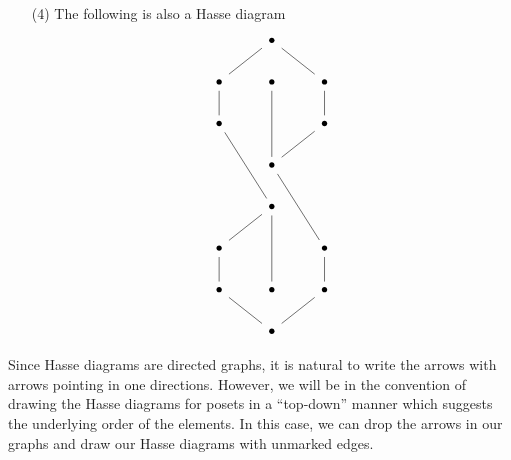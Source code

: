 \begin{example}
\begin{enumerate}
    \item[(4)] The following is also a Hasse diagram
      \[\begin{tikzcd}
        & \bullet \\
        \bullet & \bullet & \bullet \\
        \bullet && \bullet \\
                & \bullet \\
                & \bullet \\
        \bullet && \bullet \\
        \bullet & \bullet & \bullet \\
        & \bullet
        \arrow[no head, from=2-1, to=1-2]
        \arrow[no head, from=2-1, to=3-1]
        \arrow[no head, from=2-2, to=4-2]
        \arrow[no head, from=2-3, to=1-2]
        \arrow[no head, from=2-3, to=3-3]
        \arrow[no head, from=3-1, to=5-2]
        \arrow[no head, from=3-3, to=4-2]
        \arrow[no head, from=4-2, to=6-3]
        \arrow[no head, from=5-2, to=7-2]
        \arrow[no head, from=6-1, to=5-2]
        \arrow[no head, from=6-1, to=7-1]
        \arrow[no head, from=6-3, to=7-3]
        \arrow[no head, from=7-1, to=8-2]
        \arrow[no head, from=8-2, to=7-3]
      \end{tikzcd}\]
  \end{enumerate}
\end{example}

\begin{remark}
  Since Hasse diagrams are directed graphs, it is natural to write the
  arrows with arrows pointing in one directions. However, we will be
  in the convention of drawing the Hasse diagrams for posets in a
  ``top-down'' manner which suggests the underlying order of the
  elements. In this case, we can drop the arrows in our graphs and
  draw our Hasse diagrams with unmarked edges.
\end{remark}

